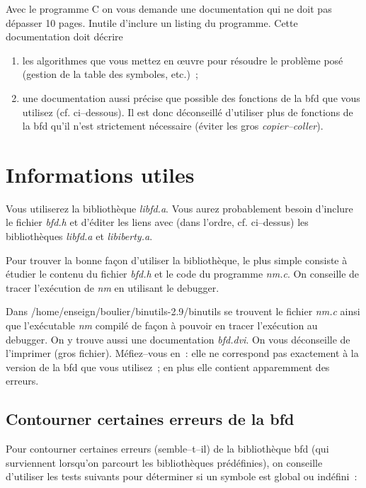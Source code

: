 \documentclass{article}
\begin{document}
Avec le programme C on vous demande une documentation qui ne doit pas
d{\'e}passer 10 pages. Inutile d'inclure un listing du programme.
Cette documentation doit d{\'e}crire 
\begin{enumerate}
\item	les algorithmes que vous mettez en {\oe}uvre pour r{\'e}soudre le
	probl{\`e}me pos{\'e} (gestion de la table des symboles, etc.)~;
\item	une documentation aussi pr{\'e}cise que possible des fonctions de la 
	bfd que vous utilisez (cf. ci--dessous). Il est donc d{\'e}conseill{\'e} 
	d'utiliser plus
	de fonctions de la bfd qu'il n'est strictement n{\'e}cessaire ({\'e}viter
	les gros \emph{copier--coller}).
\end{enumerate}

\section{Informations utiles}

Vous utiliserez la biblioth{\`e}que {\em libfd.a}.
Vous aurez probablement besoin d'inclure le fichier {\em bfd.h} et
d'{\'e}diter les liens avec (dans l'ordre, cf. ci--dessus) les biblioth{\`e}ques 
{\em libfd.a} et {\em libiberty.a}.

Pour trouver la bonne fa{\c c}on d'utiliser la biblioth{\`e}que, le plus simple consiste
{\`a} {\'e}tudier le contenu du fichier {\em bfd.h} et le code du programme {\em nm.c}. 
On conseille de tracer l'ex{\'e}cution de {\em nm} en utilisant le debugger.

Dans /home/enseign/boulier/binutils-2.9/binutils se trouvent
le fichier {\em nm.c} ainsi que l'ex{\'e}cu\-table {\em nm} compil{\'e} de fa{\c c}on
{\`a} pouvoir en tracer l'ex{\'e}cution au debugger. On y trouve aussi une
documentation {\em bfd.dvi}. On vous d{\'e}conseille de l'imprimer (gros
fichier). M{\'e}fiez--vous en~: elle ne correspond pas exactement {\`a} la version 
de la bfd que vous utilisez~; en plus elle contient apparemment des erreurs.

\subsection{Contourner certaines erreurs de la bfd}

Pour contourner certaines erreurs (semble--t--il) de la biblioth{\`e}que bfd
(qui surviennent lorsqu'on parcourt les biblioth{\`e}ques pr{\'e}d{\'e}finies), on 
conseille d'utiliser les tests suivants pour d{\'e}ter\-miner si un symbole 
est global ou ind{\'e}fini~:
\end{document}
